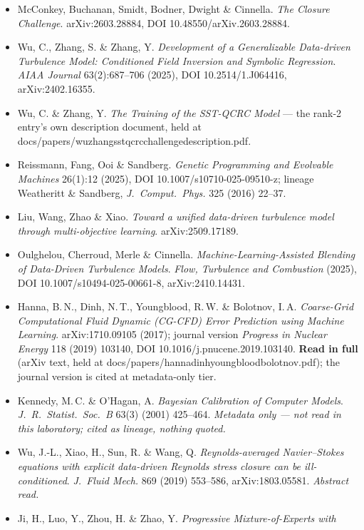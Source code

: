\documentclass[11pt,a4paper]{article}
\newcommand{\breakus}{\textunderscore\allowbreak}
\newcommand{\artifact}[1]{{\footnotesize\ttfamily\let\_\breakus #1}}
\begin{document}
\begin{itemize}
\item McConkey, Buchanan, Smidt, Bodner, Dwight \& Cinnella. \emph{The Closure Challenge}.
  arXiv:2603.28884, DOI 10.48550/arXiv.2603.28884.
\item Wu, C., Zhang, S. \& Zhang, Y. \emph{Development of a Generalizable Data-driven
  Turbulence Model: Conditioned Field Inversion and Symbolic Regression}. \emph{AIAA
  Journal} 63(2):687--706 (2025), DOI 10.2514/1.J064416, arXiv:2402.16355.
\item Wu, C. \& Zhang, Y. \emph{The Training of the SST-QCRC Model} --- the rank-2 entry's
  own description document, held at
  \artifact{docs/papers/wu\_zhang\_sst\_qcrc\_challenge\_description.pdf}.
\item Reissmann, Fang, Ooi \& Sandberg. \emph{Genetic Programming and Evolvable Machines}
  26(1):12 (2025), DOI 10.1007/s10710-025-09510-z; lineage Weatheritt \& Sandberg,
  \emph{J.\ Comput.\ Phys.} 325 (2016) 22--37.
\item Liu, Wang, Zhao \& Xiao. \emph{Toward a unified data-driven turbulence model through
  multi-objective learning}. arXiv:2509.17189.
\item Oulghelou, Cherroud, Merle \& Cinnella. \emph{Machine-Learning-Assisted Blending of
  Data-Driven Turbulence Models}. \emph{Flow, Turbulence and Combustion} (2025),
  DOI 10.1007/s10494-025-00661-8, arXiv:2410.14431.
\item Hanna, B.\,N., Dinh, N.\,T., Youngblood, R.\,W. \& Bolotnov, I.\,A.
  \emph{Coarse-Grid Computational Fluid Dynamic (CG-CFD) Error Prediction using Machine
  Learning}. arXiv:1710.09105 (2017); journal version \emph{Progress in Nuclear Energy}
  118 (2019) 103140, DOI 10.1016/j.pnucene.2019.103140. \textbf{Read in full}
  (arXiv text, held at
  \artifact{docs/papers/hanna\_dinh\_youngblood\_bolotnov\_1710.09105.pdf}); the journal
  version is cited at metadata-only tier.
\item Kennedy, M.\,C. \& O'Hagan, A. \emph{Bayesian Calibration of Computer Models}.
  \emph{J.\ R.\ Statist.\ Soc.\ B} 63(3) (2001) 425--464. \emph{Metadata only --- not
  read in this laboratory; cited as lineage, nothing quoted.}
\item Wu, J.-L., Xiao, H., Sun, R. \& Wang, Q. \emph{Reynolds-averaged Navier--Stokes
  equations with explicit data-driven Reynolds stress closure can be ill-conditioned}.
  \emph{J.\ Fluid Mech.} 869 (2019) 553--586, arXiv:1803.05581. \emph{Abstract read.}
\item Ji, H., Luo, Y., Zhou, H. \& Zhao, Y. \emph{Progressive Mixture-of-Experts with
}
\end{itemize}
\end{document}
